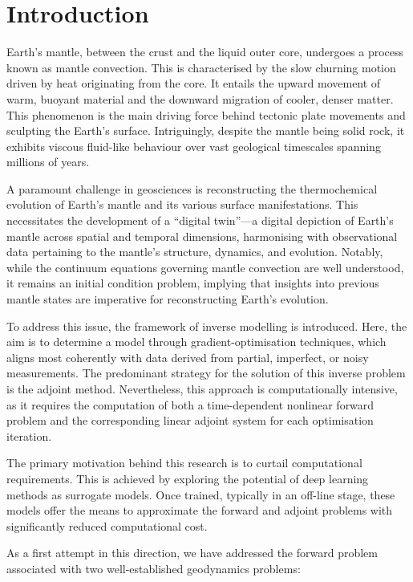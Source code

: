 \chapter{Introduction}

Earth's mantle, between the crust and the liquid outer core, undergoes a process known as mantle convection. This is characterised by the slow churning motion driven by heat originating from the core. It entails the upward movement of warm, buoyant material and the downward migration of cooler, denser matter. This phenomenon is the main driving force behind tectonic plate movements and sculpting the Earth's surface. Intriguingly, despite the mantle being solid rock, it exhibits viscous fluid-like behaviour over vast geological timescales spanning millions of years.

A paramount challenge in geosciences is reconstructing the thermochemical evolution of Earth's mantle and its various surface manifestations. This necessitates the development of a ``digital twin''—a digital depiction of Earth's mantle across spatial and temporal dimensions, harmonising with observational data pertaining to the mantle's structure, dynamics, and evolution. Notably, while the continuum equations governing mantle convection are well understood, it remains an initial condition problem, implying that insights into previous mantle states are imperative for reconstructing Earth's evolution.

To address this issue, the framework of inverse modelling is introduced. Here, the aim is to determine a model through gradient-optimisation techniques, which aligns most coherently with data derived from partial, imperfect, or noisy measurements. The predominant strategy for the solution of this inverse problem is the adjoint method. Nevertheless, this approach is computationally intensive, as it requires the computation of both a time-dependent nonlinear forward problem and the corresponding linear adjoint system for each optimisation iteration.

The primary motivation behind this research is to curtail computational requirements. This is achieved by exploring the potential of deep learning methods as surrogate models. Once trained, typically in an off-line stage, these models offer the means to approximate the forward and adjoint problems with significantly reduced computational cost.

As a first attempt in this direction, we have addressed the forward problem associated with two well-established geodynamics problems: 

